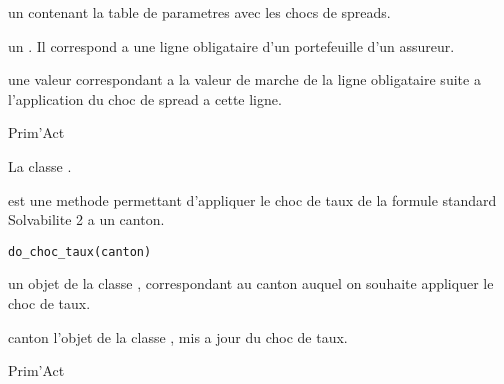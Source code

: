 \documentclass[a4paper]{book}
\begin{document}
%
\begin{Arguments}
\begin{ldescription}
\item[\code{table\_choc\_spread}] un  contenant la table de parametres avec les chocs de spreads.

\item[\code{ligne\_oblig}] un . Il correspond a une ligne obligataire d'un portefeuille 
d'un assureur.
\end{ldescription}
\end{Arguments}
%
\begin{Value}
 une valeur  correspondant a la valeur de marche de la ligne obligataire
suite a l'application du choc de spread a cette ligne.
\end{Value}
%
\begin{Author}\relax
Prim'Act
\end{Author}
%
\begin{SeeAlso}\relax
La classe .
\end{SeeAlso}
%
\begin{Description}\relax
{} est une methode permettant d'appliquer le choc de taux de la formule standard Solvabilite 2 a un canton.
\end{Description}
%
\begin{Usage}
\begin{verbatim}
do_choc_taux(canton)
\end{verbatim}
\end{Usage}
%
\begin{Arguments}
\begin{ldescription}
\item[\code{canton}] un objet de la classe , correspondant au canton auquel on souhaite appliquer le choc de taux.
\end{ldescription}
\end{Arguments}
%
\begin{Value}
canton l'objet de la classe , mis a jour du choc de taux.
\end{Value}
%
\begin{Author}\relax
Prim'Act
\end{Author}
\end{document}
